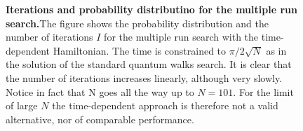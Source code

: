 \begin{figure}[ht]
  \centering
  \caption[]{\textbf{Iterations  and probability distributino for the multiple run search.}The figure shows the probability distribution and the number of iterations $I$ for the multiple run search with the time-dependent Hamiltonian. The time is constrained to $\pi/2\sqrt{N}$ as in the solution of the standard quantum walks search. It is clear that the number of iterations increases linearly, although very slowly. Notice in fact that N goes all the way up to $N=101$. For the limit of large $N$ the time-dependent approach is therefore not a valid alternative, nor of comparable performance.}
  \label{fig:iterations_complete_graph}
\end{figure}
